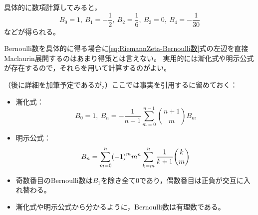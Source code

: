 \documentclass[a4paper,draft]{ltjsarticle}
\begin{document}
\begin{eg}
    具体的に数項計算してみると，
    \begin{equation}
        B_0 = 1,\ B_1 = -\frac{1}{2},\ B_2 = \frac{1}{6},\ B_3=0,\ B_4 = -\frac{1}{30}
    \end{equation}
    などが得られる。
\end{eg}

Bernoulli数を具体的に得る場合に\eqref{eq:RiemannZeta-Bernoulli数}式の左辺を直接Maclaurin展開するのはあまり得策とは言えない。
実用的には漸化式や明示公式が存在するので，それらを用いて計算するのがよい\cite[小松]{komatsu}。

（後に詳細を加筆予定であるが，）ここでは事実を引用するに留めておく：
\begin{prop}\label{prop:RiemannZeta-Bernoulli数の性質}
    \begin{itemize}
        \item 漸化式：
        \begin{equation}
            B_0=1,\ B_n = -\frac{1}{n+1}\sum_{m=0}^{n-1}\binom{n+1}{m}B_m 
        \end{equation}

        \item 明示公式：
        \begin{equation}
            B_n = \sum_{m=0}^n \pare{-1}^m m^n \sum_{k=m}^n \frac{1}{k+1}\binom{k}{m}
        \end{equation}

        \item 奇数番目のBernoulli数は$B_1$を除き全て0であり，偶数番目は正負が交互に入れ替わる。
        \item 漸化式や明示公式から分かるように，Bernoulli数は有理数である。
    \end{itemize}
\end{prop}
\end{document}

